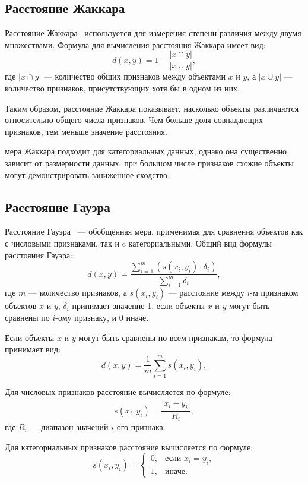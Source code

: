\subsection{Расстояние Жаккара}
Расстояние Жаккара~\cite{Jak} используется для измерения степени различия между двумя множествами. Формула для вычисления расстояния Жаккара имеет вид:
\begin{equation}
	d(x, y) = 1 - \frac{|x \cap y|}{|x \cup y|},
\end{equation}
где $|x \cap y|$ --- количество общих признаков между объектами $x$ и $y$, а $|x \cup y|$ --- количество признаков, присутствующих хотя бы в одном из них.

Таким образом, расстояние Жаккара показывает, насколько объекты различаются относительно общего числа признаков. Чем больше доля совпадающих признаков, тем меньше значение расстояния.

мера Жаккара подходит для категориальных данных, однако она существенно зависит от размерности данных: при большом числе признаков схожие объекты могут демонстрировать заниженное сходство.


\subsection{Расстояние Гауэра}
Расстояние Гауэра~\cite{Gauer} --- обобщённая мера, применимая для сравнения объектов как с числовыми признаками, так и c категориальными. Общий вид формулы расстояния Гауэра:
\begin{equation}
d(x, y) = \frac{\sum\limits_{i=1}^{m} ( s(x_i, y_i) \cdot \delta_i )}{\sum\limits_{i=1}^m \delta_i},
\end{equation}
где $m$ --- количество признаков, а $s(x_i, y_i)$ --- расстояние между $i$-м признаком объектов $x$ и $y$, $\delta_i$ принимает значение 1, если объекты $x$ и $y$ могут быть сравнены по $i$-ому признаку, и 0 иначе.

Если объекты $x$ и $y$ могут быть сравнены по всем признакам, то формула принимает вид:
\begin{equation}
	d(x, y) = \frac{1}{m} \sum\limits_{i=1}^{m} s(x_i, y_i),
\end{equation}

Для числовых признаков расстояние вычисляется по формуле:
\begin{equation}
	s(x_i, y_i) = \frac{|x_i - y_i|}{R_i},
\end{equation}
где $R_i$ --- диапазон значений $i$-ого признака.

Для категориальных признаков расстояние вычисляется по формуле:
\begin{equation}
	s(x_i, y_i) = 
	\begin{cases}
	0, & \text{если } x_i = y_i, \\
	1, & \text{иначе}.
	\end{cases}
\end{equation}

